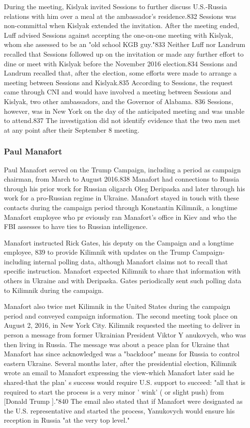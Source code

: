 During the meeting, Kislyak invited Sessions to further discuss U.S.-Russia relations with him over a  meal at the ambassador's residence.832 Sessions was non-committal when Kislyak extended the invitation. After the meeting ended, Luff advised Sessions against accepting the one-on-one meeting with Kislyak, whom she assessed to be an "old school KGB guy."833 Neither Luff nor Landrum recalled that Sessions followed up on the invitation or made any further effort to dine or meet with Kislyak before the November 2016 election.834 Sessions and Landrum recalled that, after the election, some efforts were made to arrange a meeting between Sessions and Kislyak.835 According to Sessions, the request came through CNI and would have involved a meeting between Sessions and Kislyak,  two other ambassadors, and the Governor of Alabama. 836 Sessions, however, was in New York on the day of the anticipated meeting and was unable to attend.837 The investigation did not identify evidence that the two men met at any point after their September 8 meeting.

\subsubsection{Paul Manafort}

Paul Manafort served on the Trump Campaign, including a period as campaign chairman, from March to August 2016.838 Manafort had connections to Russia through his prior work for Russian oligarch Oleg Deripaska and later through his work for a pro-Russian regime in Ukraine. Manafort stayed in touch with these contacts during the campaign period through Konstantin Kilimnik, a  longtime Manafort employee who pr eviously ran Manafort's office in Kiev and who the FBI assesses to have ties to Russian intelligence.

Manafort instructed Rick Gates, his deputy on the Campaign and a  longtime employee, 839 to provide Kilimnik with updates on the Trump Campaign-including internal polling data, although Manafort claims not to recall that specific instruction. Manafort expected Kilimnik to share that information with others in Ukraine and with Deripaska.  Gates periodically sent such polling data to Kilimnik during the campaign.

Manafort also twice met Kilimnik in the United States during the campaign period and conveyed campaign information. The second meeting took place on August 2, 2016, in New York City. Kilimnik requested the meeting to deliver in person a  message from former Ukrainian President Viktor Y anukovych, who was then living in Russia. The message was about a  peace plan for Ukraine that Manafort has since acknowledged was a  "backdoor"  means for Russia to control eastern Ukraine. Several months later, after the presidential election, Kilimnik wrote an email to Manafort expressing the view-which Manafort later said he shared-that the plan' s success would require U.S. support to succeed: "all that is required to start the process is a  very minor ' wink' ( or slight push) from [Donald Trump ]."840 The email also stated that if  Manafort were designated as the U.S. representative and started the process, Yanukovych would ensure his reception in Russia "at the very top level."

